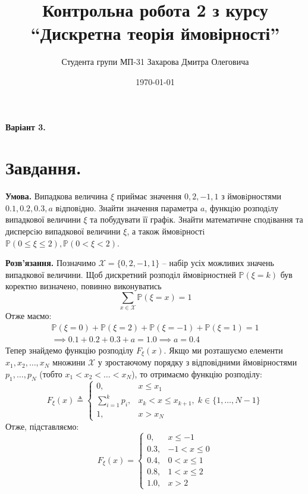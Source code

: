 \documentclass[14pt]{extarticle}
\title{Контрольна робота 2 з курсу ``Дискретна теорія ймовірності''}
\author{Студента групи МП-31 Захарова Дмитра Олеговича}
\date{\today}
\begin{document}
\maketitle

\begin{center}
\textbf{Варіант 3.}
\end{center}

\section*{Завдання.} 

\textbf{Умова.} Випадкова величина $\xi$ приймає значення $0,2,-1,1$ з ймовiрностями $0.1, 0.2, 0.3,a$ вiдповiдно. Знайти значення параметра $a$, функцiю розподiлу випадкової величини $\xi$ та побудувати її графiк. Знайти математичне сподiвання та дисперсiю випадкової величини $\xi$, а також ймовiрностi $\mathbb{P}(0 \leq \xi \leq 2), \mathbb{P}(0<\xi<2)$.

\textbf{Розв'язання.} Позначимо $\mathcal{X} = \{0,2,-1,1\}$ -- набір усіх можливих значень випадкової величини. Щоб дискретний розподіл ймовірностней $\mathbb{P}(\xi=k)$ був коректно визначено, повинно виконуватись
\[
\sum_{x \in \mathcal{X}}\mathbb{P}(\xi=x) = 1
\]
Отже маємо:
\begin{gather*}
\mathbb{P}(\xi=0) + \mathbb{P}(\xi=2) + \mathbb{P}(\xi=-1) + \mathbb{P}(\xi = 1) = 1 \\
\implies 0.1 + 0.2 + 0.3 + a = 1.0 \implies \boxed{a=0.4}
\end{gather*}
Тепер знайдемо функцію розподілу $F_{\xi}(x)$. Якщо ми розташуємо елементи $x_1,x_2,\dots,x_N$ множини $\mathcal{X}$ у зростаючому порядку з відповідними ймовірностями $p_1,\dots,p_N$ (тобто $x_1<x_2<\dots<x_N$), то отримаємо функцію розподілу:
\[
F_{\xi}(x) \triangleq \begin{cases}
    0, & x \leq x_1 \\
    \sum_{i=1}^k p_i, & x_k < x \leq x_{k+1}, \; k \in \{1,\dots,N-1\}\\
    1, & x > x_N
\end{cases}
\]
Отже, підставляємо:
\[
F_{\xi}(x) = \begin{cases}
    0, & x \leq -1 \\
    0.3, & -1 < x \leq 0 \\
    0.4, & 0 < x \leq 1 \\
    0.8, & 1 < x \leq 2 \\
    1.0, & x > 2
\end{cases}
\]
\end{document}
